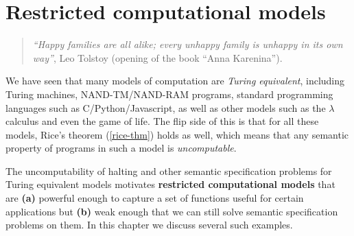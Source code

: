 \chapter{Restricted computational models}\label{restrictedchap}


\begin{quote}
\emph{``Happy families are all alike; every unhappy family is unhappy in
its own way''}, Leo Tolstoy (opening of the book ``Anna Karenina'').
\end{quote}

We have seen that many models of computation are \emph{Turing
equivalent}, including Turing machines, NAND-TM/NAND-RAM programs,
standard programming languages such as C/Python/Javascript, as well as
other models such as the \(\lambda\) calculus and even the game of life.
The flip side of this is that for all these models, Rice's theorem
(\cref{rice-thm}) holds as well, which means that any semantic property
of programs in such a model is \emph{uncomputable}.

The uncomputability of halting and other semantic specification problems
for Turing equivalent models motivates \textbf{restricted computational
models} that are \textbf{(a)} powerful enough to capture a set of
functions useful for certain applications but \textbf{(b)} weak enough
that we can still solve semantic specification problems on them. In this
chapter we discuss several such examples.

\hypertarget{restrictedmodel}{}


